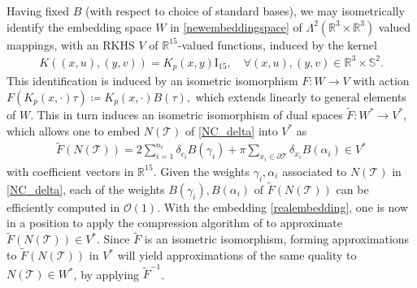 \documentclass[sn-mathphys-num]{sn-jnl}%
\theoremstyle{thmstyleone}%
\theoremstyle{thmstyletwo}%
\theoremstyle{thmstylethree}%
\numberwithin{remark}{section}
\numberwithin{definition}{section}
\numberwithin{equation}{section}
\numberwithin{theorem}{section}
\newcommand{\R}{\ensuremath{\mathbb{R}}}%
\begin{document}
Having fixed $B$ (with respect to choice of standard bases), we may isometrically identify the embedding space $W$ in \cref{newembeddingspace} of $\Lambda^{2}(\R^{3}\times \R^{3})$ valued mappings, with an RKHS $V$ of $\R^{15}$-valued functions, induced by the kernel
\begin{align*}
    K((x,u),(y,v) ) = K_{p}(x,y)\mathrm{I}_{{15}},\quad \forall (x,u),(y,v) \in \R^{3}\times \mathbb{S}^{2}.
\end{align*}
This identification is induced by an isometric isomorphism $F\colon W \to V$ with action
$
    F(K_{p}({x},\cdot)\tau) \coloneq K_{p}({x},\cdot)B(\tau),
$
which extends linearly to general elements of $W$. This in turn induces an isometric isomorphism of dual spaces $\tilde{F}\colon W^{*} \to V^{*}$, which allows one to embed $N(\mathcal{T})$ of \cref{NC_delta} into $V^{*}$ as
\begin{align}\label{realembedding}
    \tilde{F}(N(\mathcal{T})) = 2\sum_{i=1}^{n_{e}}{ \delta_{c_{i}} B(\gamma_{i})   } + {\pi}\sum_{x_{i} \in \partial\mathcal{T}}{\delta_{x_{i}} B(\alpha_{i})} \in V^{*}
\end{align}
with coefficient vectors in $\R^{15}$. Given the weights $\gamma_{i},\alpha_{i}$ associated to $N(\mathcal{T})$ in \cref{NC_delta}, each of the weights $B(\gamma_{i}), B(\alpha_{i})$ of $\tilde{F}(N(\mathcal{T}))$ can be efficiently computed in $\mathcal{O}(1)$. With the embedding \cref{realembedding}, one is now in a position to apply the compression algorithm of \cite{SparseNystromCurrVar} to approximate $\tilde{F}(N(\mathcal{T})) \in V^{*}$. Since $\tilde{F}$ is an isometric isomorphism, forming approximations to $\tilde{F}(N(\mathcal{T}))$  in $V^{*}$ will yield approximations of the same quality to $N(\mathcal{T}) \in W^{*}$, by applying $\tilde{F}^{-1}$. 


\end{document}
